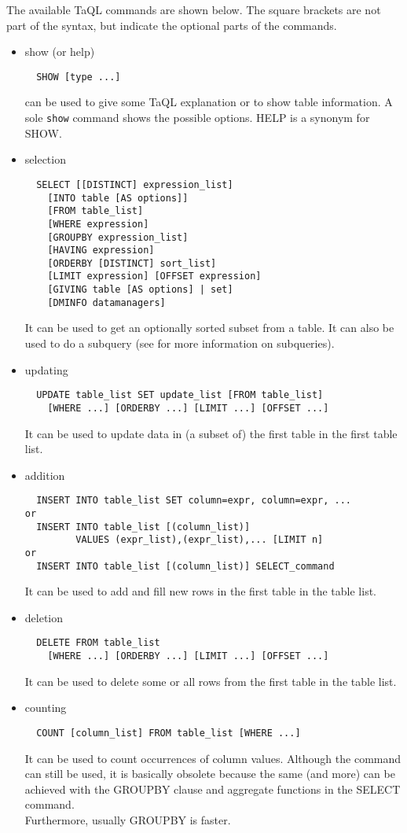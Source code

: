 The available TaQL commands are shown below. The square brackets are
not part of the syntax, but indicate the optional parts of the commands.
\begin{itemize}
\item show (or help)
\begin{verbatim}
  SHOW [type ...]
\end{verbatim}
can be used to give some TaQL explanation or to show table
information. A sole {\tt show} command shows the possible options.
HELP is a synonym for SHOW.

\item selection
\begin{verbatim}
  SELECT [[DISTINCT] expression_list]
    [INTO table [AS options]]
    [FROM table_list]
    [WHERE expression]
    [GROUPBY expression_list]
    [HAVING expression]
    [ORDERBY [DISTINCT] sort_list]
    [LIMIT expression] [OFFSET expression]
    [GIVING table [AS options] | set]
    [DMINFO datamanagers]
\end{verbatim}
It can be used to get an optionally sorted subset from a table. It can
also be used to do a subquery
(see  
for more information on subqueries).

\item updating
\begin{verbatim}
  UPDATE table_list SET update_list [FROM table_list]
    [WHERE ...] [ORDERBY ...] [LIMIT ...] [OFFSET ...]
\end{verbatim}
It can be used to update data in (a subset of) the first table in the
first table list. 

\item addition
\begin{verbatim}
  INSERT INTO table_list SET column=expr, column=expr, ...
or
  INSERT INTO table_list [(column_list)]
         VALUES (expr_list),(expr_list),... [LIMIT n]
or
  INSERT INTO table_list [(column_list)] SELECT_command
\end{verbatim}
It can be used to add and fill new rows in the first table in the
table list.

\item deletion
\begin{verbatim}
  DELETE FROM table_list
    [WHERE ...] [ORDERBY ...] [LIMIT ...] [OFFSET ...]
\end{verbatim}
It can be used to delete some or all rows from the first table
in the table list.

\item counting
\begin{verbatim}
  COUNT [column_list] FROM table_list [WHERE ...]
\end{verbatim}
It can be used to count occurrences of column values. Although the
command can still be used, it is basically
obsolete because the same (and more) can be achieved with the GROUPBY
clause and aggregate functions in the SELECT command.
\\Furthermore, usually GROUPBY is faster.


\end{itemize}
